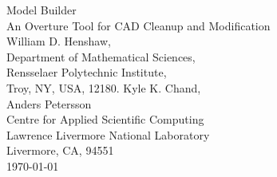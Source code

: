\documentclass[11pt]{article}
\begin{document}

\def\uvd    {{\bf U}}
\def\ud     {{    U}}
\def\pd     {{    P}}
\def\id     {i}
\def\jd     {j}
\def\kap {\sqrt{s+\omega^2}}

\newcommand{\mapping}{\homeHenshaw/Overture/mapping}
\newcommand{\figures}{\homeHenshaw/OvertureFigures}

\vspace{3\baselineskip}
\begin{flushleft}
  {\Large 
   Model Builder  \\ 
   An Overture Tool for CAD Cleanup and Modification  \\
  }
\baselineskip
\vspace{2\baselineskip}
William D. Henshaw,\\
Department of Mathematical Sciences, \\
Rensselaer Polytechnic Institute, \\
Troy, NY, USA, 12180.
\baselineskip
{\large Kyle K. Chand,  }             \\
{\large Anders Petersson}             \\
\baselineskip
Centre for Applied Scientific Computing \\
Lawrence Livermore National Laboratory    \\
Livermore, CA, 94551   \\
\baselineskip
\today \\
\baselineskip

\end{flushleft}

\vspace{1\baselineskip}

\begin{abstract}
This document describes the {\tt ModelBuilder} class. This class can be used
to build geometric models, read, edit, repair and modify CAD geometries.
Some of the features are
\begin{itemize}
 \item read CAD geometries from IGES files.
 \item automatic detection of many errors in the CAD representation such as invalid
    trimming curves.
 \item repair CAD geometries through interactive editing of the trimming curves
 \item modify CAD geometries to remove features, ... 
 \item automatically build the topology (connectivity) of the patched model, (closing gaps and removing overlaps),
  and constructing a water-tight representation of the CAD surface using a global triangulation.
\end{itemize}
\end{abstract}
\end{document}
